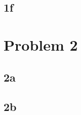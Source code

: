\documentclass{article}
\begin{document}
\subsection*{1f}
\section*{Problem 2}
\subsection*{2a}
\subsection*{2b}
\end{document}

